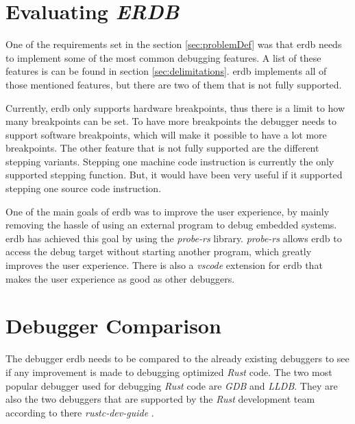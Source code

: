 \section{Evaluating \emph{ERDB}} %
One of the requirements set in the section \ref{sec:problemDef} was that \gls{erdb} needs to implement some of the most common debugging features.
A list of these features is can be found in section \ref{sec:delimitations}.
\gls{erdb} implements all of those mentioned features, but there are two of them that is not fully supported.


Currently, \gls{erdb} only supports hardware breakpoints, thus there is a limit to how many breakpoints can be set.
To have more breakpoints the debugger needs to support software breakpoints, which will make it possible to have a lot more breakpoints.
The other feature that is not fully supported are the different stepping variants.
Stepping one machine code instruction is currently the only supported stepping function.
But, it would have been very useful if it supported stepping one source code instruction.


One of the main goals of \gls{erdb} was to improve the user experience, by mainly removing the hassle of using an external program to debug embedded systems.
\gls{erdb} has achieved this goal by using the \emph{probe-rs} library.
\emph{probe-rs} allows \gls{erdb} to access the debug target without starting another program, which greatly improves the user experience.
There is also a \emph{vscode} extension for \gls{erdb} that makes the user experience as good as other debuggers.



\section{Debugger Comparison} %
\label{sec:debuggercomparison}


The debugger \gls{erdb} needs to be compared to the already existing debuggers to see if any improvement is made to debugging optimized \emph{Rust} code.
The two most popular debugger used for debugging \emph{Rust} code are \emph{GDB} and \emph{LLDB}.
They are also the two debuggers that are supported by the \emph{Rust} development team according to there \emph{rustc-dev-guide} \cite{rust-dev-guide}.


